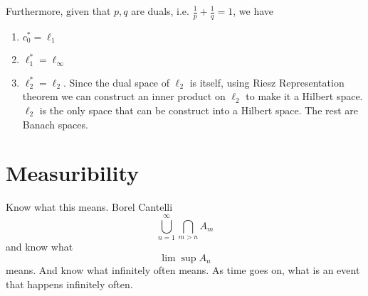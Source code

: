 \documentclass{article}
\theoremstyle{remark}
\theoremstyle{definition}
\begin{document}
Furthermore, given that $p, q$ are duals, i.e. $\frac{1}{p} + \frac{1}{q} = 1$, we have 
\begin{enumerate}
    \item $c_0^* = \ell_1$
    \item $\ell_1^* = \ell_\infty$ 
    \item $\ell_2^* = \ell_2$. Since the dual space of $\ell_2$ is itself, using Riesz Representation theorem we can construct an inner product on $\ell_2$ to make it a Hilbert space. $\ell_2$ is the only space that can be construct into a Hilbert space. The rest are Banach spaces. 
\end{enumerate}

\section{Measuribility}
Know what this means. Borel Cantelli
\[\bigcup_{n=1}^\infty \bigcap_{m > n} A_m \]
and know what
\[\lim \sup A_n\]
means. And know what infinitely often means. As time goes on, what is an event that happens infinitely often. 
\end{document}
